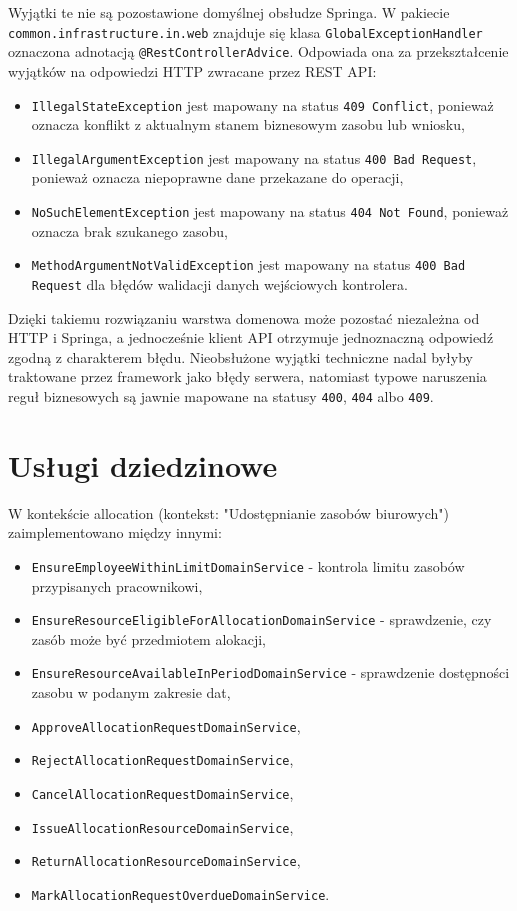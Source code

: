 Wyjątki te nie są pozostawione domyślnej obsłudze Springa. W pakiecie \texttt{common.infrastructure.in.web} znajduje się klasa \texttt{GlobalExceptionHandler} oznaczona adnotacją \texttt{@RestControllerAdvice}. Odpowiada ona za przekształcenie wyjątków na odpowiedzi HTTP zwracane przez REST API:
\begin{itemize}
    \item \texttt{IllegalStateException} jest mapowany na status \texttt{409 Conflict}, ponieważ oznacza konflikt z aktualnym stanem biznesowym zasobu lub wniosku,
    \item \texttt{IllegalArgumentException} jest mapowany na status \texttt{400 Bad Request}, ponieważ oznacza niepoprawne dane przekazane do operacji,
    \item \texttt{NoSuchElementException} jest mapowany na status \texttt{404 Not Found}, ponieważ oznacza brak szukanego zasobu,
    \item \texttt{MethodArgumentNotValidException} jest mapowany na status \texttt{400 Bad Request} dla błędów walidacji danych wejściowych kontrolera.
\end{itemize}

Dzięki takiemu rozwiązaniu warstwa domenowa może pozostać niezależna od HTTP i Springa, a jednocześnie klient API otrzymuje jednoznaczną odpowiedź zgodną z charakterem błędu. Nieobsłużone wyjątki techniczne nadal byłyby traktowane przez framework jako błędy serwera, natomiast typowe naruszenia reguł biznesowych są jawnie mapowane na statusy \texttt{400}, \texttt{404} albo \texttt{409}.

\section{Usługi dziedzinowe}

W kontekście allocation (kontekst: "Udostępnianie zasobów biurowych") zaimplementowano między innymi:
\begin{itemize}
    \item \texttt{EnsureEmployeeWithinLimitDomainService} - kontrola limitu zasobów przypisanych pracownikowi,
    \item \texttt{EnsureResourceEligibleForAllocationDomainService} - sprawdzenie, czy zasób może być przedmiotem alokacji,
    \item \texttt{EnsureResourceAvailableInPeriodDomainService} - sprawdzenie dostępności zasobu w podanym zakresie dat,
    \item \texttt{ApproveAllocationRequestDomainService},
    \item \texttt{RejectAllocationRequestDomainService},
    \item \texttt{CancelAllocationRequestDomainService},
    \item \texttt{IssueAllocationResourceDomainService},
    \item \texttt{ReturnAllocationResourceDomainService},
    \item \texttt{MarkAllocationRequestOverdueDomainService}.
\end{itemize}

